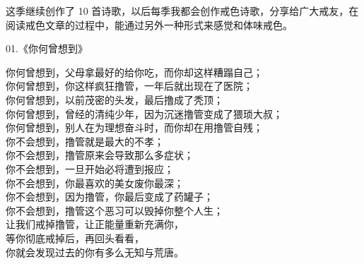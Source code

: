 这季继续创作了 10 首诗歌，以后每季我都会创作戒色诗歌，分享给广大戒友，在阅读戒色文章的过程中，能通过另外一种形式来感觉和体味戒色。

\begin{center}
    01.《你何曾想到》\it

    你何曾想到，父母拿最好的给你吃，而你却这样糟蹋自己； \\ 你何曾想到，你这样疯狂撸管，一年后就出现在了医院； \\ 你何曾想到，以前茂密的头发，最后撸成了秃顶； \\ 你何曾想到，曾经的清纯少年，因为沉迷撸管变成了猥琐大叔； \\ 你何曾想到，别人在为理想奋斗时，而你却在用撸管自残； \\ 你不会想到，撸管就是最大的不孝； \\ 你不会想到，撸管原来会导致那么多症状； \\ 你不会想到，一旦开始必将遭到报应； \\ 你不会想到，你最喜欢的美女废你最深； \\ 你不会想到，因为撸管，你最后变成了药罐子； \\ 你不会想到，撸管这个恶习可以毁掉你整个人生； \\ 让我们戒掉撸管，让正能量重新充满你， \\ 等你彻底戒掉后，再回头看看， \\ 你就会发现过去的你有多么无知与荒唐。
\end{center}

